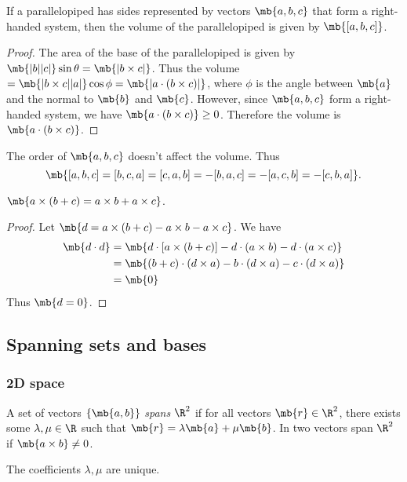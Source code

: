 \documentclass[a4paper]{article}
\begin{document}
\begin{prop}
  If a parallelopiped has sides represented by vectors $\mb{a, b, c}$ that form a right-handed system, then the volume of the parallelopiped is given by $\mb{[a, b, c]}$.
\end{prop}

\begin{proof}
  The area of the base of the parallelopiped is given by $\mb{|b||c|}\sin\theta = \mb{|b\times c|}$. Thus the volume$ = \mb{|b\times c||a|}\cos\phi = \mb{|a\cdot(b\times c)|}$, where $\phi$ is the angle between $\mb{a}$ and the normal to $\mb{b}$ and $\mb{c}$. However, since $\mb{a, b, c}$ form a right-handed system, we have $\mb{a\cdot (b\times c)} \geq 0$. Therefore the volume is $\mb{a\cdot(b\times c)}$.
\end{proof}
\note The order of $\mb{a, b, c}$ doesn't affect the volume. Thus
\[
\mb{[a, b, c] = [b, c, a] = [c, a, b] = -[b, a, c] = -[a, c, b] = -[c, b, a]}.
\]

\begin{thm}
  $\mb{a\times (b + c) = a\times b + a\times c}$.
\end{thm}
\begin{proof}
  Let $\mb{d = a\times (b + c) - a\times b - a\times c}$. We have
  \begin{align*}
    \mb{d\cdot d} &= \mb{d\cdot[a\times (b + c)] - d\cdot(a\times b) - d\cdot(a\times c)}\\
    &= \mb{(b+c)\cdot(d \times a) - b\cdot(d\times a) - c\cdot(d\times a)}\\
    &= \mb{0}
  \end{align*}
  Thus $\mb{d = 0}$.
\end{proof}

\subsection{Spanning sets and bases}
\subsubsection{2D space}
\begin{defi}
  A set of vectors $\{\mb{a, b}\}$ \emph{spans} $\R^2$ if for all vectors $\mb{r}\in \R^2$, there exists some $\lambda, \mu\in \R$ such that $\mb{r} = \lambda\mb{a} + \mu\mb{b}$. In two vectors span $\R^2$  if $\mb{a\times b}\not= 0$.
\end{defi}
\begin{thm}
  The coefficients $\lambda, \mu$ are unique.
\end{thm}
\end{document}
